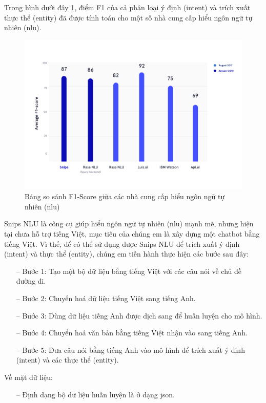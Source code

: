 Trong hình dưới đây \ref{fig:benchmarks}, điểm F1 của cả phân loại ý định (intent) và trích xuất thực thể (entity) đã được tính toán cho một số nhà cung cấp hiểu ngôn ngữ tự nhiên (\ac{nlu}).

\begin{figure}[H]
    \centering
    \includegraphics[width=15cm]{images/benchmarks.png}
    \caption{Bảng so sánh F1-Score giữa các nhà cung cấp hiểu ngôn ngữ tự nhiên (\ac{nlu})}
    \label{fig:benchmarks}
\end{figure}

Snips NLU là công cụ giúp hiểu ngôn ngữ tự nhiên (\ac{nlu}) mạnh mẽ, nhưng hiện tại chưa hỗ trợ tiếng Việt, mục tiêu của chúng em là xây dựng một chatbot bằng tiếng Việt. Vì thế, để có thể sử dụng được Snips NLU để trích xuất ý định (intent) và thực thể (entity), chúng em tiến hành thực hiện các bước sau đây:
\begin{itemize}
    \item[--] Bước 1: Tạo một bộ dữ liệu bằng tiếng Việt với các câu nói về chủ đề đường đi.
    \item[--] Bước 2: Chuyển hoá dữ liệu tiếng Việt sang tiếng Anh.
    \item[--] Bước 3: Dùng dữ liệu tiếng Anh được dịch sang để huấn luyện cho mô hình.
    \item[--] Bước 4: Chuyển hoá văn bản bằng tiếng Việt nhận vào sang tiếng Anh.
    \item[--] Bước 5: Đưa câu nói bằng tiếng Anh vào mô hình để trích xuất ý định (intent) và các thực thể (entity).
\end{itemize}

Về mặt dữ liệu:
\begin{itemize}
    \item[--] Định dạng bộ dữ liệu huấn luyện là ở dạng json.
\end{itemize}

